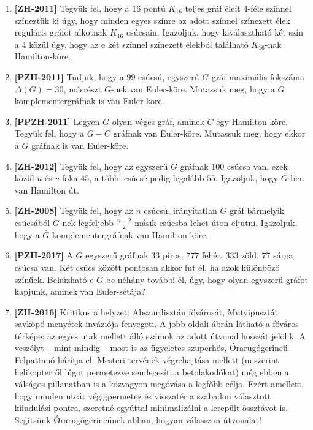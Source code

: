 \documentclass[a4paper,12pt]{article}
\begin{document}
\begin{enumerate}
            \item \textbf{[ZH-2011]} Tegyük fel, hogy a $16$ pontú $K_{16}$ teljes gráf éleit $4$-féle színnel színeztük ki úgy, hogy minden egyes színre az adott színnel színezett élek reguláris gráfot alkotnak $K_{16}$ csúcsain. Igazoljuk, hogy kiválasztható két szín a $4$ közül úgy, hogy az e két színnel színezett élekből található $K_{16}$-nak Hamilton-köre.

            \item \textbf{[PZH-2011]} Tudjuk, hogy a $99$ csúcsú, egyszerű $G$ gráf maximális fokszáma $\Delta(G)=30$, másrészt $G$-nek van Euler-köre. Mutassuk meg, hogy a $\bar{G}$ komplementergráfnak is van Euler-köre.

            \item \textbf{[PPZH-2011]} Legyen $G$ olyan véges gráf, aminek $C$ egy Hamilton köre. Tegyük fel, hogy a $G-C$ gráfnak van Euler-köre. Mutassuk meg, hogy ekkor a $G$ gráfnak is van Euler-köre.

            \item \textbf{[ZH-2012]} Tegyük fel, hogy az egyszerű $G$ gráfnak $100$ csúcsa van, ezek közül $u$ és $v$ foka $45$, a többi csúcsé pedig legalább $55$. Igazoljuk, hogy $G$-ben van Hamilton út.

            \item \textbf{[ZH-2008]} Tegyük fel, hogy az $n$ csúcsú, irányítatlan $G$ gráf bármelyik csúcsából $G$-nek legfeljebb $\frac{n-2}{2}$ másik csúcsba lehet úton eljutni. Igazoljuk, hogy a $\bar{G}$ komplementergráfnak van Hamilton köre.

            \item \textbf{[PZH-2017]} A $G$ egyszerű gráfnak $33$ piros, $777$ fehér, $333$ zöld, $77$ sárga csúcsa van. Két csúcs között pontosan akkor fut él, ha azok különböző színűek. Behúzható-e $G$-be néhány további él, úgy, hogy olyan egyszerű gráfot kapjunk, aminek van Euler-sétája?

            \item \textbf{[ZH-2016]} Kritikus a helyzet: Abszurdisztán fővárosát, Mutyipusztát savköpő menyétek inváziója fenyegeti. A jobb oldali ábrán látható a főváros térképe: az egyes utak mellett álló számok az adott útvonal hosszát jelölik. A veszélyt -- mint mindig -- most is az ügyeletes szuperhős, Órarugógerincű Felpattanó hárítja el. Mesteri tervének végrehajtása mellett (miszerint helikopterről lúgot permetezve semlegesíti a betolakodókat) még ebben a válságos pillanatban is a közvagyon megóvása a legfőbb célja. Ezért amellett, hogy minden utcát végigpermetez és visszatér a szabadon választott kiindulási pontra, szeretné egyúttal minimalizálni a lerepült össztávot is. Segítsünk Órarugógerincűnek abban, hogyan válasszon útvonalat!
            \begin{figure}[h]
                \centering
                
            \end{figure}


\end{enumerate}
\end{document}
